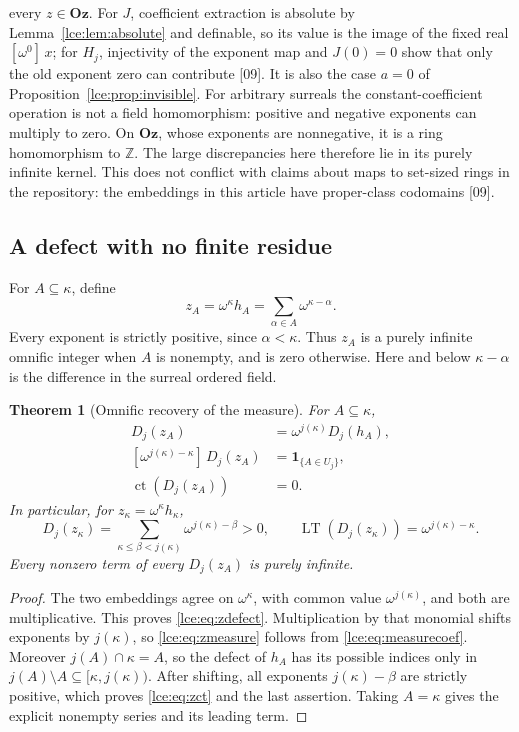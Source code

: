 \documentclass[11pt,letterpaper]{article}
\numberwithin{equation}{section}
\newtheorem{theorem}{Theorem}[section]
\theoremstyle{definition}
\theoremstyle{remark}
\newcommand{\Oz}{\mathbf{Oz}}
\newcommand{\Z}{\mathbb Z}
\newcommand{\LT}{\operatorname{LT}}
\newcommand{\ct}{\operatorname{ct}}
\newcommand{\coef}[2]{[\omega^{#1}]\,#2}
\newcommand{\prref}[1]{Proposition~\ref{#1}}
\newcommand{\leref}[1]{Lemma~\ref{#1}}
\newcommand{\src}[1]{\textup{\textsf{\small[#1]}}}%
\begin{document}
every $z\in\Oz$. For $J$, coefficient extraction is absolute by
\leref{lce:lem:absolute} and definable, so its value is the image of the
fixed real $\coef{0}{x}$; for $H_j$, injectivity of the exponent map and
$J(0)=0$ show that only the old exponent zero can contribute \src{09}. It is
also the case $a=0$ of \prref{lce:prop:invisible}. For arbitrary surreals
the constant-coefficient operation is not a field homomorphism: positive
and negative exponents can multiply to zero. On $\Oz$, whose exponents are
nonnegative, it is a ring homomorphism to $\Z$. The large discrepancies here
therefore lie in its purely infinite kernel. This does not conflict with
claims about maps to set-sized rings in the repository: the embeddings in
this article have proper-class codomains \src{09}.

\subsection{A defect with no finite residue}
For $A\subseteq\kappa$, define
\begin{equation}\label{lce:eq:zA}
 z_A=\omega^\kappa h_A
     =\sum_{\alpha\in A}\omega^{\kappa-\alpha}.
\end{equation}
Every exponent is strictly positive, since $\alpha<\kappa$.
Thus $z_A$ is a purely infinite omnific integer when $A$ is nonempty,
and is zero otherwise. Here and below $\kappa-\alpha$ is the difference
in the surreal ordered field.

\begin{theorem}[Omnific recovery of the measure]\label{lce:thm:Ozmeasure}
For $A\subseteq\kappa$,
\begin{align}
 D_j(z_A)&=\omega^{j(\kappa)}D_j(h_A),\label{lce:eq:zdefect}\\
 \coef{j(\kappa)-\kappa}{D_j(z_A)}
      &=\mathbf 1_{\{A\in U_j\}},\label{lce:eq:zmeasure}\\
 \ct(D_j(z_A))&=0.\label{lce:eq:zct}
\end{align}
In particular, for $z_\kappa=\omega^\kappa h_\kappa$,
\[
 D_j(z_\kappa)=
   \sum_{\kappa\le\beta<j(\kappa)}\omega^{j(\kappa)-\beta}>0,
 \qquad
 \LT(D_j(z_\kappa))=\omega^{j(\kappa)-\kappa}.
\]
Every nonzero term of every $D_j(z_A)$ is purely infinite.
\end{theorem}
\begin{proof}
The two embeddings agree on $\omega^\kappa$, with common value
$\omega^{j(\kappa)}$, and both are multiplicative. This proves
\eqref{lce:eq:zdefect}. Multiplication by that monomial shifts exponents by
$j(\kappa)$, so \eqref{lce:eq:zmeasure} follows from
\eqref{lce:eq:measurecoef}. Moreover $j(A)\cap\kappa=A$, so the defect of
$h_A$ has its possible indices only in
$j(A)\setminus A\subseteq[\kappa,j(\kappa))$.
After shifting, all exponents $j(\kappa)-\beta$ are strictly positive,
which proves \eqref{lce:eq:zct} and the last assertion. Taking $A=\kappa$
gives the explicit nonempty series and its leading term.
\end{proof}
\end{document}

